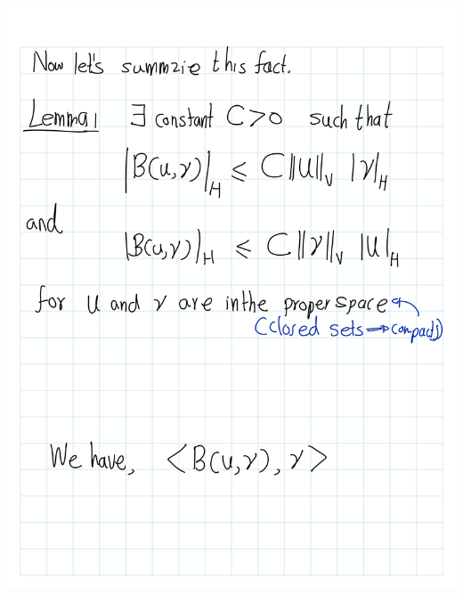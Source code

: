 \documentclass[
]{book}
\theoremstyle{definition}
\theoremstyle{definition}
\theoremstyle{definition}
\theoremstyle{definition}
\theoremstyle{remark}
\begin{document}
\includegraphics[width=18cm,height=\textheight]{fig/Book/fig book-7.png}

  
\end{document}
